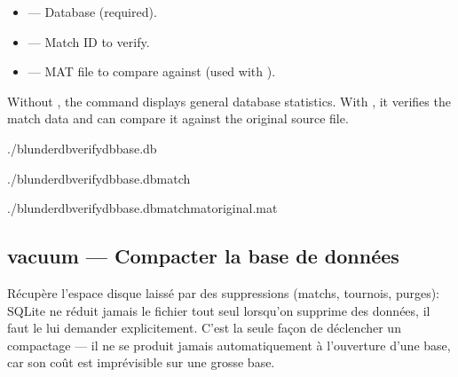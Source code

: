 \documentclass[letterpaper,10pt,english]{sphinxmanual}
\begin{document}
\sphinxAtStartPar
{}
\begin{itemize}
\item {} 
\sphinxAtStartPar
{} — Database (required).

\item {} 
\sphinxAtStartPar
{} — Match ID to verify.

\item {} 
\sphinxAtStartPar
{} — MAT file to compare against (used with ).

\end{itemize}

\sphinxAtStartPar
Without , the command displays general database statistics. With , it verifies the match data and can compare it against the original source file.

\sphinxAtStartPar
{}

\begin{sphinxVerbatim}[commandchars=\\\{\}]
./blunderdbverify\PYGZhy{}\PYGZhy{}dbbase.db

./blunderdbverify\PYGZhy{}\PYGZhy{}dbbase.db\PYGZhy{}\PYGZhy{}match

./blunderdbverify\PYGZhy{}\PYGZhy{}dbbase.db\PYGZhy{}\PYGZhy{}match\PYGZhy{}\PYGZhy{}matoriginal.mat
\end{sphinxVerbatim}


\subsection{vacuum — Compacter la base de données}
\label{\detokenize{cli:vacuum-compacter-la-base-de-donnees}}
\sphinxAtStartPar
Récupère l’espace disque laissé par des suppressions (matchs, tournois,
purges): SQLite ne réduit jamais le fichier tout seul lorsqu’on supprime des
données, il faut le lui demander explicitement. C’est la seule façon de
déclencher un compactage — il ne se produit jamais automatiquement à
l’ouverture d’une base, car son coût est imprévisible sur une grosse base.
\end{document}
